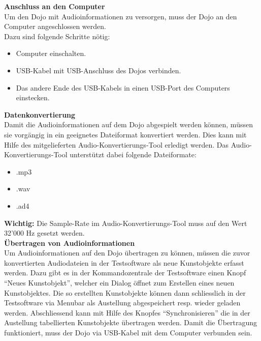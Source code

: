 \label{datenaustauschkapitel} 
\textbf{Anschluss an den Computer}
\\[4mm]
Um den Dojo mit Audioinformationen zu versorgen, muss der Dojo an den Computer angeschlossen werden.
\\[4mm]
Dazu sind folgende Schritte nötig:
\begin{itemize}
\item Computer einschalten.
\end{itemize}
\begin{itemize}
\item USB-Kabel mit USB-Anschluss des Dojos verbinden.
\end{itemize}
\begin{itemize}
\item Das andere Ende des USB-Kabels in einen USB-Port des Computers einstecken.
\end{itemize}
\textbf{Datenkonvertierung}
\\[4mm]
Damit die Audioinformationen auf dem Dojo abgespielt werden können, müssen sie vorgängig in ein geeignetes Dateiformat konvertiert werden. Dies kann mit Hilfe des mitgelieferten Audio-Konvertierungs-Tool erledigt werden. Das Audio-Konvertierungs-Tool unterstützt dabei folgende Dateiformate:
\begin{itemize}
\item .mp3
\end{itemize}
\begin{itemize}
\item .wav
\end{itemize}
\begin{itemize}
\item .ad4
\end{itemize}
\textbf{Wichtig:} Die Sample-Rate im Audio-Konvertierungs-Tool muss auf den Wert 32'000 Hz gesetzt werden.
\\[4mm]
\textbf{Übertragen von Audioinformationen}
\\[4mm]
Um Audioinformationen auf den Dojo übertragen zu können, müssen die zuvor konvertierten Audiodateien in der Testsoftware als neue Kunstobjekte erfasst werden. Dazu gibt es in der Kommandozentrale der Testsoftware einen Knopf ``Neues Kunstobjekt'', welcher ein Dialog öffnet zum Erstellen eines neuen Kunstobjektes. Die so erstellten Kunstobjekte können dann schliesslich in der Testsoftware via Menubar als Austellung abgespeichert resp. wieder geladen werden. Abschliessend kann mit Hilfe des Knopfes ``Synchronisieren'' die in der Austellung tabellierten Kunstobjekte übertragen werden. Damit die Übertragung funktioniert, muss der Dojo via USB-Kabel mit dem Computer verbunden sein.
